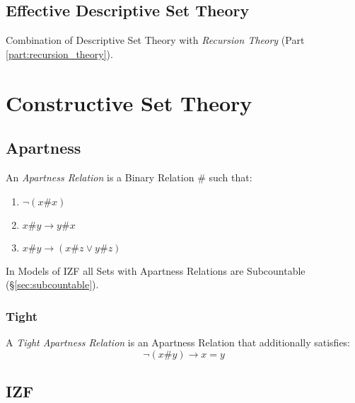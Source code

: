 \subsection{Effective Descriptive Set Theory}
\label{sec:effective_descriptive}

Combination of Descriptive Set Theory with \emph{Recursion Theory}
(Part \ref{part:recursion_theory}).



\section{Constructive Set Theory}\label{sec:constructive_set_theory}

\subsection{Apartness}\label{sec:apartness}

An \emph{Apartness Relation} is a Binary Relation $\#$ such that:

\begin{enumerate}
\item $\neg (x\#x)$
\item $x\#y \rightarrow y\#x$
\item $x\#y \rightarrow (x\#z \vee y\#z)$
\end{enumerate}

In Models of IZF all Sets with Apartness Relations are Subcountable
(\S\ref{sec:subcountable}).



\subsubsection{Tight}\label{sec:tight}

A \emph{Tight Apartness Relation} is an Apartness Relation that
additionally satisfies:
\[
  \neg (x \# y) \rightarrow x = y
\]



\subsection{IZF}\label{sec:izf}

